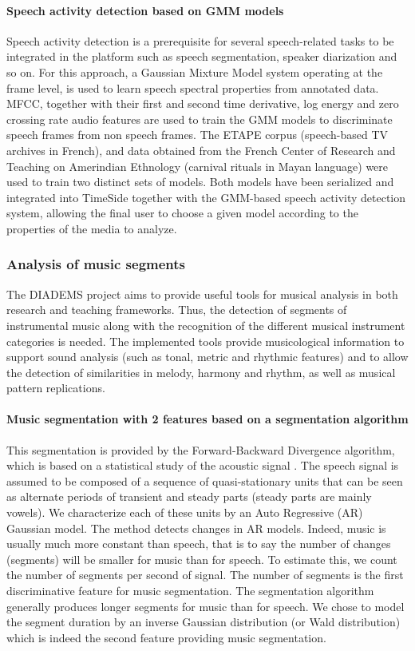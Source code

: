 \documentclass{sig-alternate}
\newcommand{\squeezeup}{\vspace{-2.5mm}}
\begin{document}
\squeezeup\paragraph{Speech activity detection based on GMM models}
Speech activity detection is a prerequisite for several speech-related tasks to be integrated in the platform such as speech segmentation, speaker diarization and so on.
For this approach, a Gaussian Mixture Model system operating at the frame level, is used to learn speech spectral properties from annotated data.
MFCC, together with their first and second time derivative, log energy and zero crossing rate audio features are used to train the GMM models to discriminate speech frames from non speech frames.
The ETAPE corpus \cite{gravier2012etape} (speech-based TV archives in French), and data obtained from the French Center of Research and Teaching on Amerindian Ethnology (carnival rituals in Mayan language) were used to train two distinct sets of models.
Both models have been serialized and integrated into TimeSide together with the GMM-based speech activity detection system, allowing the final user to choose a given model according to the properties of the media to analyze.

\subsubsection{Analysis of music segments}
The DIADEMS project aims to provide useful tools for musical analysis in both research and teaching frameworks. Thus, the detection of segments of instrumental music along with the recognition of the different musical instrument categories is needed. The implemented tools provide musicological information to support sound analysis (such as tonal, metric and rhythmic features) and to allow the detection of similarities in melody, harmony and rhythm, as well as musical pattern replications.

\squeezeup\paragraph{Music segmentation with 2 features based on a segmentation algorithm} 
This segmentation is provided by the Forward-Backward Divergence algorithm, which is based on a statistical study of the acoustic signal \cite{Obrecht1988}. The speech signal is assumed to be composed of a sequence of quasi-stationary units that can be seen as alternate periods of transient and steady parts (steady parts are mainly vowels). We characterize  each of these units by an Auto Regressive (AR) Gaussian model. The method detects changes in AR models. Indeed, music is usually much more constant than speech, that is to say the number of changes (segments) will be smaller for music than for speech. To estimate this, we count the number of segments per second of signal. The number of segments is the first discriminative feature for music segmentation.
The segmentation algorithm  generally produces longer segments for music than for speech. We chose to model the segment duration by an inverse Gaussian distribution (or Wald distribution) which is indeed the second feature providing music segmentation.
\end{document}
